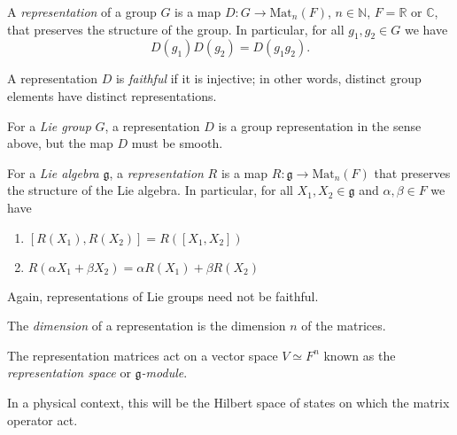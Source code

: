 \begin{definition}
  A \emph{representation} of a group $G$ is a map $D \colon G \to \text{Mat}_n(F)$, $n \in \mathbb{N}$, $F = \mathbb{R} \text{ or } \mathbb{C}$, that preserves the structure  of the group. In particular, for all $g_1, g_2 \in G$ we have
  \begin{equation}
    D(g_1) D(g_2) = D(g_1 g_2).
  \end{equation}
\end{definition}
\begin{definition}[]
  A representation $D$ is \emph{faithful} if it is injective; in other words, distinct group elements have distinct representations.
\end{definition}
\begin{definition}
  For a \emph{Lie group} $G$, a representation $D$ is a group representation in the sense above, but the map $D$ must be smooth.
\end{definition}
\begin{definition}[]
  For a \emph{Lie algebra} $\mathfrak{g}$, a \emph{representation} $R$ is a map $R: \mathfrak{g} \to \text{Mat}_n(F)$ that preserves the structure of the Lie algebra. In particular, for all $X_1, X_2 \in \mathfrak{g}$ and $\alpha, \beta \in F$ we have
  \begin{enumerate}
    \item $[R(X_1), R(X_2)] = R([X_1, X_2])$
    \item $R(\alpha X_1 + \beta X_2) = \alpha R(X_1) + \beta R(X_2)$
  \end{enumerate}
\end{definition}
\begin{leftbar}
  \begin{remark}
    Again, representations of Lie groups need not be faithful.
  \end{remark}
\end{leftbar}
\begin{definition}[]
  The \emph{dimension} of a representation is the dimension $n$ of the matrices.
\end{definition}
\begin{definition}[]
  The representation matrices act on a vector space $V \simeq F^n$ known as the \emph{representation space} or \emph{$\mathfrak{g}$-module}.
\end{definition}
\begin{leftbar}
  \begin{remark}
    In a physical context, this will be the Hilbert space of states on which the matrix operator act.
  \end{remark}
\end{leftbar}

